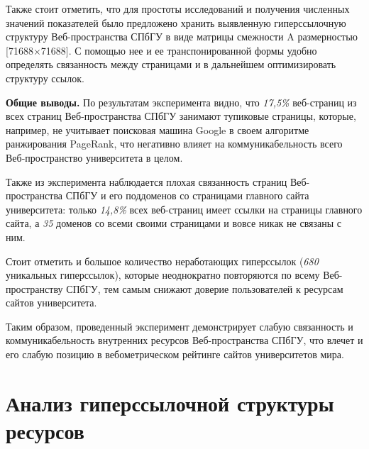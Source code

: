 Также стоит отметить, что для простоты исследований и получения численных значений показателей было предложено хранить выявленную гиперссылочную структуру Веб-пространства СПбГУ в виде матрицы смежности A размерностью [71688\(\times\)71688]. С помощью нее и ее транспонированной формы удобно определять связанность между страницами и в дальнейшем оптимизировать структуру ссылок. 

\textbf{Общие выводы.} По результатам эксперимента видно, что \textit{17,5\%} веб-страниц из всех страниц Веб-пространства СПбГУ занимают тупиковые страницы, которые, например, не учитывает поисковая машина Google в своем алгоритме ранжирования PageRank, что негативно влияет на коммуникабельность всего Веб-пространство университета в целом. 

Также из эксперимента наблюдается плохая связанность страниц Веб-пространства СПбГУ и его поддоменов со страницами главного сайта университета: только \textit{14,8\%} всех веб-страниц имеет ссылки на страницы главного сайта, а \textit{35} доменов со всеми своими страницами и вовсе никак не связаны с ним. 

Стоит отметить и большое количество неработающих гиперссылок (\textit{680} уникальных гиперссылок), которые неоднократно повторяются по всему Веб-пространству СПбГУ, тем самым снижают доверие пользователей к ресурсам сайтов университета. 

Таким образом, проведенный эксперимент демонстрирует слабую связанность и коммуникабельность внутренних ресурсов Веб-пространства СПбГУ, что влечет и его слабую позицию в вебометрическом рейтинге сайтов университетов мира.

\section{Анализ гиперссылочной структуры ресурсов}\label{sec:markup}

